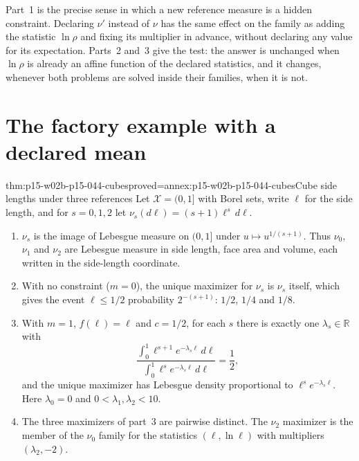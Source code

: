 Part~1 is the precise sense in which a new reference measure is a hidden
constraint. Declaring \(\nu'\) instead of \(\nu\) has the same effect on
the family as adding the statistic \(\ln\rho\) and fixing its multiplier in
advance, without declaring any value for its expectation. Parts~2 and~3
give the test: the answer is unchanged when \(\ln\rho\) is already an
affine function of the declared statistics, and it changes, whenever both
problems are solved inside their families, when it is not.

\section{The factory example with a declared mean}
\label{sec:p15-w02b-p15-044-cubes}

\begin{hbtheorem}{thm:p15-w02b-p15-044-cubes}{proved=annex:p15-w02b-p15-044-cubes}{Cube side lengths under three references}
Let \(\mathcal X=(0,1]\) with Borel sets, write \(\ell\) for the side
length, and for \(s=0,1,2\) let \(\nu_s(d\ell)=(s+1)\ell^s\,d\ell\).
\begin{enumerate}
\item \(\nu_s\) is the image of Lebesgue measure on \((0,1]\) under
\(u\mapsto u^{1/(s+1)}\). Thus \(\nu_0\), \(\nu_1\) and \(\nu_2\) are
Lebesgue measure in side length, face area and volume, each written in the
side-length coordinate.
\item With no constraint (\(m=0\)), the unique maximizer for \(\nu_s\) is
\(\nu_s\) itself, which gives the event \(\ell\leq1/2\) probability
\(2^{-(s+1)}\): \(1/2\), \(1/4\) and \(1/8\).
\item With \(m=1\), \(f(\ell)=\ell\) and \(c=1/2\), for each \(s\) there is
exactly one \(\lambda_s\in\mathbb R\) with
\[
   \frac{\int_0^1\ell^{s+1}e^{-\lambda_s\ell}\,d\ell}
        {\int_0^1\ell^{s}e^{-\lambda_s\ell}\,d\ell}=\frac12 ,
\]
and the unique maximizer has Lebesgue density proportional to
\(\ell^se^{-\lambda_s\ell}\). Here \(\lambda_0=0\) and
\(0<\lambda_1,\lambda_2<10\).
\item The three maximizers of part~3 are pairwise distinct. The \(\nu_2\)
maximizer is the member of the \(\nu_0\) family for the statistics
\((\ell,\ln\ell)\) with multipliers \((\lambda_2,-2)\).
\end{enumerate}
\end{hbtheorem}

